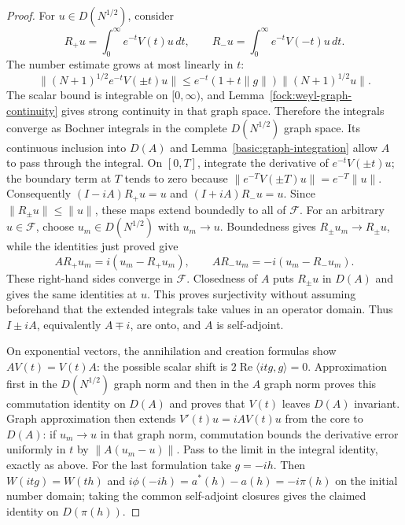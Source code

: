 \documentclass[11pt,a4paper]{article}
\theoremstyle{definition}
\theoremstyle{remark}
\begin{document}
\begin{proof}
For $u\in D(N^{1/2})$, consider
\[
 R_+u=\int_0^\infty e^{-t}V(t)u\,dt,
 \qquad R_-u=\int_0^\infty e^{-t}V(-t)u\,dt.
\]
The number estimate grows at most linearly in $t$:
\[
 \|(N+1)^{1/2}e^{-t}V(\pm t)u\|
    \leq e^{-t}(1+t\|g\|)\|(N+1)^{1/2}u\|.
\]
The scalar bound is integrable on $[0,\infty)$, and
Lemma~\ref{fock:weyl-graph-continuity} gives strong continuity in
that graph space. Therefore the integrals converge as Bochner
integrals in the complete $D(N^{1/2})$ graph space. Its continuous inclusion into $D(A)$
and Lemma~\ref{basic:graph-integration} allow $A$ to pass through
the integral. On $[0,T]$, integrate the derivative of
$e^{-t}V(\pm t)u$; the boundary term at $T$ tends to zero because
$\|e^{-T}V(\pm T)u\|=e^{-T}\|u\|$. Consequently
$(I-iA)R_+u=u$ and $(I+iA)R_-u=u$.
Since $\|R_\pm u\|\leq\|u\|$, these maps extend boundedly to all of
$\mathcal F$. For an arbitrary $u\in\mathcal F$, choose
$u_m\in D(N^{1/2})$ with $u_m\to u$. Boundedness gives
$R_\pm u_m\to R_\pm u$, while the identities just proved give
\[
 AR_+u_m=i(u_m-R_+u_m),\qquad
 AR_-u_m=-i(u_m-R_-u_m).
\]
These right-hand sides converge in $\mathcal F$. Closedness of $A$
puts $R_\pm u$ in $D(A)$ and gives the same identities at $u$.
This proves surjectivity without assuming beforehand that the
extended integrals take values in an operator domain. Thus $I\pm iA$, equivalently $A\mp i$, are onto, and
$A$ is self-adjoint.

On exponential vectors, the annihilation and creation formulas show
$AV(t)=V(t)A$: the possible scalar shift is
$2\operatorname{Re}\langle itg,g\rangle=0$.
Approximation first in the $D(N^{1/2})$ graph norm and then in the
$A$ graph norm proves this commutation identity on $D(A)$ and proves
that $V(t)$ leaves $D(A)$ invariant. Graph
approximation then extends $V'(t)u=iAV(t)u$ from the core to $D(A)$:
if $u_m\to u$ in that graph norm, commutation bounds the derivative
error uniformly in $t$ by $\|A(u_m-u)\|$. Pass to the limit in
the integral identity, exactly as above.
For the last formulation take $g=-ih$. Then $W(itg)=W(th)$ and
$i\phi(-ih)=a^*(h)-a(h)=-i\pi(h)$ on the initial number domain;
taking the common self-adjoint closures gives the claimed identity on
$D(\pi(h))$.
\end{proof}
\end{document}
